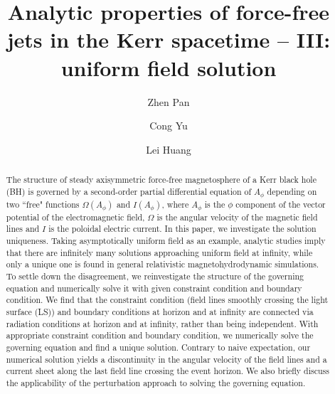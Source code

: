 \documentclass[iop,apj]{emulateapj}
\begin{document}
\title{Analytic properties of force-free jets in the Kerr spacetime -- III:\\
uniform field solution}


\author{Zhen Pan}

\author{Cong Yu}

\author{Lei Huang}



\begin{abstract}
The structure of steady axisymmetric force-free magnetosphere of a Kerr black hole (BH) is governed
by a second-order partial differential equation of $A_\phi$ depending on two ``free" functions
$\Omega(A_\phi)$ and $I(A_\phi)$, where $A_\phi$ is the $\phi$ component of the vector
potential of the electromagnetic field, $\Omega$ is the angular velocity of the magnetic
field lines and $I$ is the poloidal electric current.
In this paper, we investigate the solution uniqueness.
Taking asymptotically uniform field as an example, analytic studies imply that
there are infinitely many solutions approaching uniform field at infinity,
while only a unique one is found in general relativistic magnetohydrodynamic simulations.
To settle down the disagreement, we reinvestigate the structure of the governing equation
and numerically solve it with given constraint condition and boundary condition.
We find that the constraint condition
(field lines smoothly crossing the light surface (LS))
and boundary conditions at horizon and at infinity
are connected via radiation conditions at horizon and at infinity, rather than being independent.
With appropriate constraint condition and boundary condition, we numerically solve the governing equation
and find a unique solution. Contrary to naive expectation,
our numerical solution yields a discontinuity in the angular velocity of the field lines
and a current sheet along the last field line crossing the event horizon.
We also briefly discuss the applicability of the perturbation approach to solving the governing equation.
\end{abstract}
\end{document}
